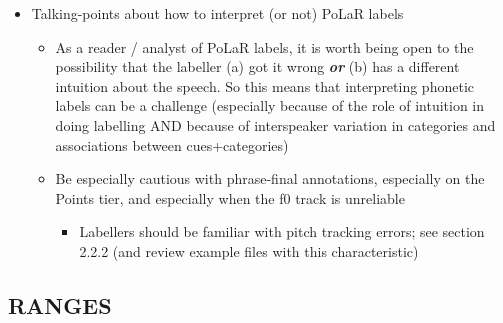 \documentclass[11pt, twoside]{memoir}
\begin{document}
\begin{itemize}
\begin{itemize}
\begin{itemize}
\begin{itemize}
        \begin{itemize}
        \tightlist
        \item
          detail-reduction process (e.g., ``binning'' within-labeller
          differences under a single label: ?* and * and ** all reduced
          to *)\\
        \item
          consensus-building practices (e.g., with the PoLaR plugin)\\
        \end{itemize}
      \end{itemize}
    \item
      \textbf{hearken back to this point early on in 2.1.2 Points
      Tier}\\
    \end{itemize}
  \item
    Talking-points about how to interpret (or not) PoLaR labels

    \begin{itemize}
    \tightlist
    \item
      As a reader / analyst of PoLaR labels, it is worth being open to
      the possibility that the labeller (a) got it wrong
      \textbf{\emph{or}} (b) has a different intuition about the speech.
      So this means that interpreting phonetic labels can be a challenge
      (especially because of the role of intuition in doing labelling
      AND because of interspeaker variation in categories and
      associations between cues+categories)\\
    \item
      Be especially cautious with phrase-final annotations, especially
      on the Points tier, and especially when the f0 track is unreliable

      \begin{itemize}
      \tightlist
      \item
        Labellers should be familiar with pitch tracking errors; see
        section 2.2.2 (and review example files with this
        characteristic)
      \end{itemize}
    \end{itemize}
  \end{itemize}
\end{itemize}

\hypertarget{ranges}{%
\subsection{\texorpdfstring{\textbf{RANGES}}{RANGES}}\label{ranges}}
\end{document}
